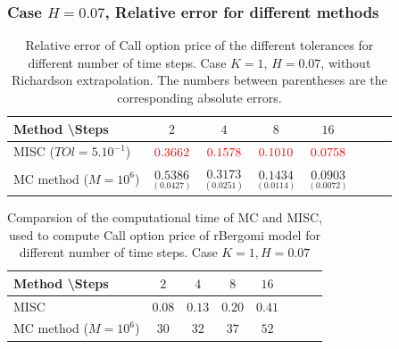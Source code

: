 \documentclass[11pt]{article}
\begin{document}
\subsubsection*{Case $H=0.07$, Relative error for different methods}
\label{sec:Case $H=0.07$, Relative error for different methods}
\begin{table}[h!]
	\centering
	\begin{tabular}{l*{6}{c}r}
		Method \textbackslash  Steps            & $2$ & $4$ & $8$ & $16$ &   \\
		\hline
		MISC ($TOl=5.10^{-1}$)  & ${\color{red}0.3662}$ & ${\color{red}0.1578}$ & ${\color{red}0.1010}$ & ${\color{red}0.0758}$  \\
		MC method ($M=10^{6}$)   & $\underset{(0.0427)}{\mathbf{0.5386}}$  & $\underset{ (  0.0251)}{\mathbf{0.3173}}$  & $\underset{(  0.0114)}{\mathbf{0.1434}}$ & $\underset{(0.0072)}{\mathbf{0.0903}}$  \\	
		\hline
	\end{tabular}
	\caption{Relative error of Call option price of the different tolerances for different number of time steps. Case $K=1$, $H=0.07$, without Richardson extrapolation. The numbers between parentheses are the corresponding absolute errors.}
	\label{Relative error of Call option price of the different tolerances for different number of time steps. Case $K=1, H=0.07$}
\end{table}



\begin{table}[h!]
	\centering
	\begin{tabular}{l*{6}{c}r}
		Method \textbackslash  Steps            & $2$ & $4$ & $8$ & $16$ &   \\
		\hline
		MISC  & $0.08$ & $0.13$ & $0.20$ & $0.41$  \\	
		MC method ($M=10^6$)   & $30$  & $32$  & $37$ & $52$  \\	
		\hline
	\end{tabular}
	\caption{Comparsion of the computational time of  MC and MISC, used to compute Call option price of rBergomi model for different number of time steps. Case $K=1, H=0.07$}
	\label{Comparsion of the computational time of  MC and MISC, used to compute Call option price of rBergomi model for different number of time steps. Case $K=1, H=0.07$}
\end{table}
\end{document}
